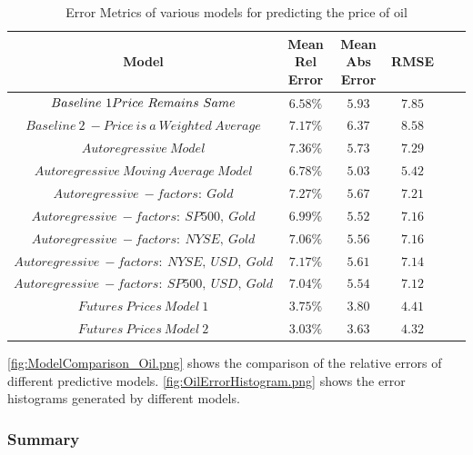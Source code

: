 \documentclass[runningheads]{llncs}
\begin{document}
\begin{table}
\begin{center}
\begin{tabular}{|c|c|c|c|c|c}
\hline
\textbf{Model} & \textbf{Mean Rel Error} & \textbf{Mean Abs Error} & \textbf{RMSE} \\ \hline \hline$ Baseline\ 1\- Price\ Remains\ Same$ & $6.58\%$ & $5.93$ & $7.85$ \\ \hline
$ Baseline\ 2\ - Price\ is\ a\ Weighted\ Average$ & $7.17\%$ & $6.37$ & $8.58$ \\ \hline\hline
$ Autoregressive\ Model $ & $7.36\%$ & $5.73$ & $7.29$\\ \hline
$ Autoregressive\ Moving\ Average\ Model $ & $6.78\%$ & $5.03$ & $5.42$ \\ \hline\hline
$ Autoregressive\ - factors:\ Gold $ & $7.27\%$ & $5.67$ & $7.21$ \\ \hline
$ Autoregressive\ - factors:\ SP500,\ Gold $ & $6.99\%$ & $5.52$ & $7.16$ \\ \hline
$ Autoregressive\ - factors:\ NYSE,\ Gold $ & $7.06\%$ & $5.56$ & $7.16$ \\ \hline
$ Autoregressive\ - factors:\ NYSE,\ USD,\ Gold $ & $7.17\%$ & $5.61$ & $7.14$ \\ \hline
$ Autoregressive\ - factors:\ SP500,\ USD,\ Gold $ & $7.04\%$ & $5.54$ & $7.12$ \\ \hline\hline
$ Futures\ Prices\ Model\ 1 $ & $3.75\%$ & $3.80$ & $4.41$ \\ \hline
$ Futures\ Prices\ Model\ 2 $ & $3.03\%$ & $3.63$ & $4.32$ \\ \hline
\end{tabular}
\end{center} 
\caption{Error Metrics of various models for predicting the price of oil}
\end{table} 


\autoref{fig:ModelComparison_Oil.png} shows the comparison of the relative errors of different predictive models. \autoref{fig:OilErrorHistogram.png} shows the error histograms generated by different models.


\subsubsection{Summary}
\end{document}
